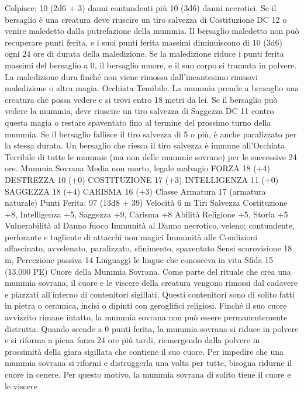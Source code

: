 \begin{multicols}{2}
Colpisce: 10 (2d6 + 3) danni contundenti più 10 (3d6) danni
necrotici. Se il bersaglio è una creatura deve riuscire un tiro
salvezza di Costituzione DC 12 o venire maledetto dalla
putrefazione della mummia. Il bersaglio maledetto non può
recuperare punti ferita, e i suoi punti ferita massimi diminuiscono
di 10 (3d6) ogni 24 ore di durata della maledizione. Se la
maledizione riduce i punti ferita massimi del bersaglio a 0, il
bersaglio muore, e il suo corpo si tramuta in polvere. La
maledizione dura finché non viene rimossa dall’incantesimo
rimuovi maledizione o altra magia.
Occhiata Temibile. La mummia prende a bersaglio una creatura
che possa vedere e si trovi entro 18 metri da lei. Se il bersaglio
può vedere la mummia, deve riuscire un tiro salvezza di
Saggezza DC 11 contro questa magia o restare spaventato fino al
termine del prossimo turno della mummia. Se il bersaglio fallisce
il tiro salvezza di 5 o più, è anche paralizzato per la stessa durata.
Un bersaglio che riesca il tiro salvezza è immune all’Occhiata
Terribile di tutte le mummie (ma non delle mummie sovrane) per
le successive 24 ore.
Mummia Sovrana
Media non morto, legale malvagio
FORZA 18 (+4)
DESTREZZA 10 (+0)
COSTITUZIONE 17 (+3)
INTELLIGENZA 11 (+0)
SAGGEZZA 18 (+4)
CARISMA 16 (+3)
Classe Armatura 17 (armatura naturale)
\hspace*{0pt}\hfill{Punti Ferita}: 97 (13d8 + 39)
Velocità 6 m
Tiri Salvezza Costituzione +8, Intelligenza +5, Saggezza +9,
Carisma +8
Abilità Religione +5, Storia +5
Vulnerabilità al Danno fuoco
Immunità al Danno necrotico, veleno; contundente, perforante
e tagliente di attacchi non magici
Immunità alle Condizioni affascinato, avvelenato, paralizzato,
sfinimento, spaventato
Sensi scurovisione 18 m, Percezione passiva 14
Linguaggi le lingue che conosceva in vita
Sfida 15 (13.000 PE)
Cuore della Mummia Sovrana. Come parte del rituale che crea
una mummia sovrana, il cuore e le viscere della creatura
vengono rimossi dal cadavere e piazzati all’interno di contenitori
sigillati. Questi contenitori sono di solito fatti in pietra o
ceramica, incisi o dipinti con geroglifici religiosi.
Finché il suo cuore avvizzito rimane intatto, la mummia sovrana
non può essere permanentemente distrutta. Quando scende a 0
punti ferita, la mummia sovrana si riduce in polvere e si riforma
a piena forza 24 ore più tardi, riemergendo dalla polvere in
prossimità della giara sigillata che contiene il suo cuore. Per
impedire che una mummia sovrana si riformi e distruggerla una
volta per tutte, bisogna ridurne il cuore in cenere. Per questo
motivo, la mummia sovrana di solito tiene il cuore e le viscere

\end{multicols}
